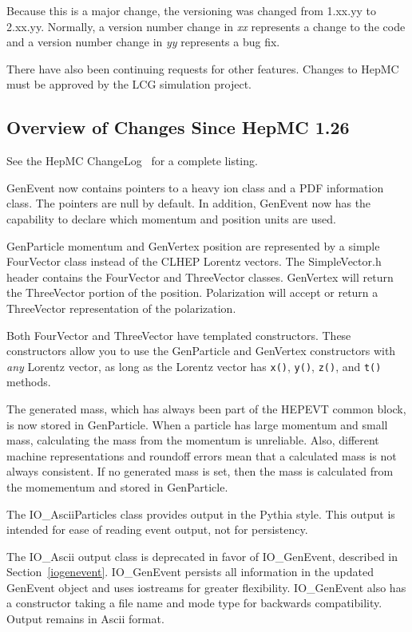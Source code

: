 \documentclass[11pt,letterpaper]{article}
\begin{document}
Because this is a major change, the versioning was changed 
from 1.xx.yy to 2.xx.yy.  Normally, a version number change in \emph{xx} 
represents a change to the code and a version number change in \emph{yy}
represents a bug fix.

There have also been continuing requests for other features.
Changes to HepMC must be approved by the LCG simulation project.  

%
%

\subsection{Overview of Changes Since HepMC 1.26}

See the HepMC ChangeLog~\cite{changelog} for a complete listing.

GenEvent now contains pointers to a heavy ion class and a PDF information class.
The pointers are null by default.  
In addition, GenEvent now has the capability to declare which
momentum and position units are used.

GenParticle momentum and GenVertex position are represented by a simple FourVector 
class instead of the CLHEP Lorentz vectors.  
The SimpleVector.h header contains the FourVector and ThreeVector classes.
GenVertex will return the ThreeVector portion of the position.
Polarization will accept or return a ThreeVector representation 
of the polarization.

Both FourVector and ThreeVector have templated constructors.  
These constructors allow you to use the GenParticle and GenVertex constructors
with \emph{any} Lorentz vector, as long as the Lorentz vector has 
\verb!x()!, \verb!y()!, \verb!z()!, and \verb!t()! methods.

The generated mass, which has always been part of the HEPEVT common block, 
is now stored in GenParticle.  
When a particle has large momentum and small mass, 
calculating the mass from the momentum is unreliable.
Also, different machine representations and roundoff errors mean that
a calculated mass is not always consistent.
If no generated mass is set, then the mass is calculated from the momementum 
and stored in GenParticle.

The IO\_AsciiParticles class provides output in the Pythia style.
This output is intended for ease of reading event output, not for persistency.

The IO\_Ascii output class is deprecated in favor of IO\_GenEvent, 
described in Section~\ref{iogenevent}.  
IO\_GenEvent persists all information in the updated GenEvent object and
uses iostreams for greater flexibility.  IO\_GenEvent also has a 
constructor taking a file name and mode type for backwards compatibility. 
Output remains in Ascii format.
\end{document}
